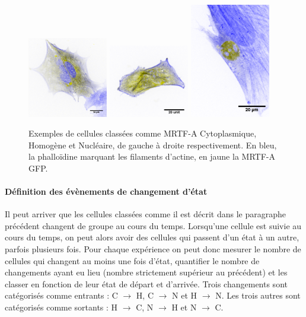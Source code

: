 \documentclass{report}
\begin{document}
 \begin{figure}
  \includegraphics[width=3.5cm]{Figures/Exemple_C_invert.png} 
 \includegraphics[width=3.5cm]{Figures/Exemple_H_invert.png} 
 \includegraphics[width=3.5cm]{Figures/Exemple_N_invert.png} 
 \caption{Exemples de cellules classées comme MRTF-A Cytoplasmique, Homogène et Nucléaire, de gauche à droite respectivement. En bleu, la phalloïdine marquant les filaments d'actine, en jaune la MRTF-A GFP.\label{Exemples_CHN}}

 \end{figure}
 
 \paragraph{Définition des évènements de changement d'état}
 
 Il peut arriver que les cellules classées comme il est décrit dans le paragraphe précédent changent de groupe au cours du temps. 
 Lorsqu'une cellule est suivie au cours du temps, on peut alors avoir des cellules qui passent d'un état à un autre, parfois plusieurs fois. 
 Pour chaque expérience on peut donc mesurer le nombre de cellules qui changent au moins une fois d'état, quantifier le nombre de changements ayant eu lieu (nombre strictement supérieur au précédent) et les classer en fonction de leur état de départ et d'arrivée. 
 Trois changements sont catégorisés comme \og entrants \fg : C $\rightarrow$ H, C $\rightarrow$ N et H $\rightarrow$ N. 
 Les trois autres sont catégorisés comme \og sortants \fg  : H $\rightarrow$ C, N $\rightarrow$ H et N $\rightarrow$ C. 
 
\end{document}
